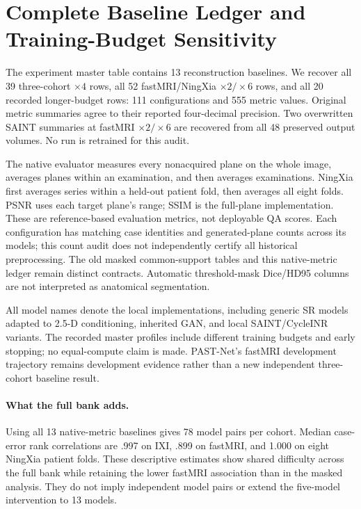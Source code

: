 \section{Complete Baseline Ledger and Training-Budget Sensitivity}
The experiment master table contains 13 reconstruction baselines. We recover all 39 three-cohort $\times4$ rows, all 52 fastMRI/NingXia $\times2/\times6$ rows, and all 20 recorded longer-budget rows: 111 configurations and 555 metric values. Original metric summaries agree to their reported four-decimal precision. Two overwritten SAINT summaries at fastMRI $\times2/\times6$ are recovered from all 48 preserved output volumes. No run is retrained for this audit.

The native evaluator measures every nonacquired plane on the whole image, averages planes within an examination, and then averages examinations. NingXia first averages series within a held-out patient fold, then averages all eight folds. PSNR uses each target plane's range; SSIM is the full-plane implementation. These are reference-based evaluation metrics, not deployable QA scores. Each configuration has matching case identities and generated-plane counts across its models; this count audit does not independently certify all historical preprocessing. The old masked common-support tables and this native-metric ledger remain distinct contracts. Automatic threshold-mask Dice/HD95 columns are not interpreted as anatomical segmentation.

All model names denote the local implementations, including generic SR models adapted to 2.5-D conditioning, inherited GAN, and local SAINT/CycleINR variants. The recorded master profiles include different training budgets and early stopping; no equal-compute claim is made. PAST-Net's fastMRI development trajectory remains development evidence rather than a new independent three-cohort baseline result.

\paragraph{What the full bank adds.}
Using all 13 native-metric baselines gives 78 model pairs per cohort. Median case-error rank correlations are .997 on IXI, .899 on fastMRI, and 1.000 on eight NingXia patient folds. These descriptive estimates show shared difficulty across the full bank while retaining the lower fastMRI association than in the masked analysis. They do not imply independent model pairs or extend the five-model intervention to 13 models.

